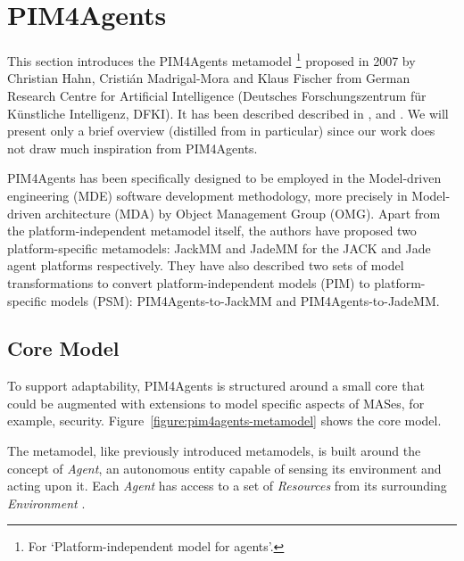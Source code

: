 \section{PIM4Agents}

This section introduces the PIM4Agents metamodel 
\footnote{For `Platform-independent model for agents'.}
proposed in 2007 by Christian Hahn, Cristián Madrigal-Mora and Klaus Fischer from German Research Centre for Artificial Intelligence (Deutsches Forschungszentrum f\"{u}r K\"{u}nstliche Intelligenz, DFKI).
It has been described described in \cite{Hahn07a}, \cite{Hahn07b} and \cite{Hahn08}.
We will present only a brief overview (distilled from \cite{Hahn07b} in particular) since our work does not draw much inspiration from PIM4Agents.


PIM4Agents has been specifically designed to be employed in the Model-driven engineering (MDE) software development methodology, more precisely in Model-driven architecture (MDA) by Object Management Group (OMG).
Apart from the platform-independent metamodel itself, the authors have proposed two platform-specific metamodels: JackMM and JadeMM for the JACK and Jade agent platforms respectively.
They have also described two sets of model transformations to convert platform-independent models (PIM) to platform-specific models (PSM): PIM4Agents-to-JackMM and PIM4Agents-to-JadeMM.

\subsection*{Core Model}

To support adaptability, PIM4Agents is structured around a small core that could be augmented with extensions to model specific aspects of MASes, for example, security.
Figure~\ref{figure:pim4agents-metamodel} shows the core model.

The metamodel, like previously introduced metamodels, is built around the concept of \textit{Agent}, an autonomous entity capable of sensing its environment and acting upon it.
Each \textit{Agent} has access to a set of \textit{Resources} from its surrounding \textit{Environment} \cite{Hahn07b}.

